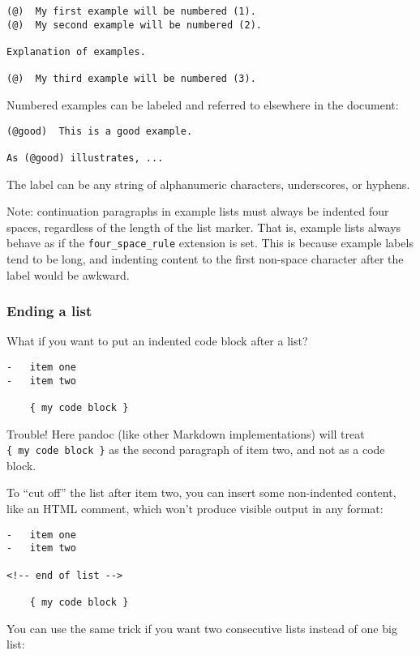 \documentclass[
]{article}
\begin{document}
\begin{verbatim}
(@)  My first example will be numbered (1).
(@)  My second example will be numbered (2).

Explanation of examples.

(@)  My third example will be numbered (3).
\end{verbatim}

Numbered examples can be labeled and referred to elsewhere in the
document:

\begin{verbatim}
(@good)  This is a good example.

As (@good) illustrates, ...
\end{verbatim}

The label can be any string of alphanumeric characters, underscores, or
hyphens.

Note: continuation paragraphs in example lists must always be indented
four spaces, regardless of the length of the list marker. That is,
example lists always behave as if the \texttt{four\_space\_rule}
extension is set. This is because example labels tend to be long, and
indenting content to the first non-space character after the label would
be awkward.

\subsubsection{Ending a list}\label{ending-a-list}

What if you want to put an indented code block after a list?

\begin{verbatim}
-   item one
-   item two

    { my code block }
\end{verbatim}

Trouble! Here pandoc (like other Markdown implementations) will treat
\texttt{\{\ my\ code\ block\ \}} as the second paragraph of item two,
and not as a code block.

To ``cut off'' the list after item two, you can insert some non-indented
content, like an HTML comment, which won't produce visible output in any
format:

\begin{verbatim}
-   item one
-   item two

<!-- end of list -->

    { my code block }
\end{verbatim}

You can use the same trick if you want two consecutive lists instead of
one big list:
\end{document}
